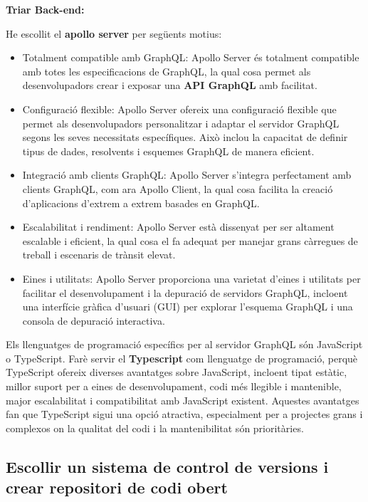 \documentclass[a4paper,12pt,twoside]{ThesisStyle}
\begin{document}
\vspace{5mm}

\textbf{Triar Back-end:}

\vspace{3mm}

He escollit el \textbf{apollo server} per següents motius:
\begin{itemize}
    \item Totalment compatible amb GraphQL: Apollo Server és totalment compatible amb totes les especificacions de GraphQL, la qual cosa permet als desenvolupadors crear i exposar una \textbf{API GraphQL} amb facilitat.
    \item Configuració flexible: Apollo Server ofereix una configuració flexible que permet als desenvolupadors personalitzar i adaptar el servidor GraphQL segons les seves necessitats específiques. Això inclou la capacitat de definir tipus de dades, resolvents i esquemes GraphQL de manera eficient.
    \item Integració amb clients GraphQL: Apollo Server s'integra perfectament amb clients GraphQL, com ara Apollo Client, la qual cosa facilita la creació d'aplicacions d'extrem a extrem basades en GraphQL.
    \item Escalabilitat i rendiment: Apollo Server està dissenyat per ser altament escalable i eficient, la qual cosa el fa adequat per manejar grans càrregues de treball i escenaris de trànsit elevat.
    \item Eines i utilitats: Apollo Server proporciona una varietat d'eines i utilitats per facilitar el desenvolupament i la depuració de servidors GraphQL, incloent una interfície gràfica d'usuari (GUI) per explorar l'esquema GraphQL i una consola de depuració interactiva.
\end{itemize}

Els llenguatges de programació específics per al servidor GraphQL són JavaScript o TypeScript. Farè servir el \textbf{Typescript} com llenguatge de programació, perquè TypeScript ofereix diverses avantatges sobre JavaScript, incloent tipat estàtic, millor suport per a eines de desenvolupament, codi més llegible i mantenible, major escalabilitat i compatibilitat amb JavaScript existent. Aquestes avantatges fan que TypeScript sigui una opció atractiva, especialment per a projectes grans i complexos on la qualitat del codi i la mantenibilitat són prioritàries.



\subsection{Escollir un sistema de control de versions i crear repositori de codi obert}
\end{document}
